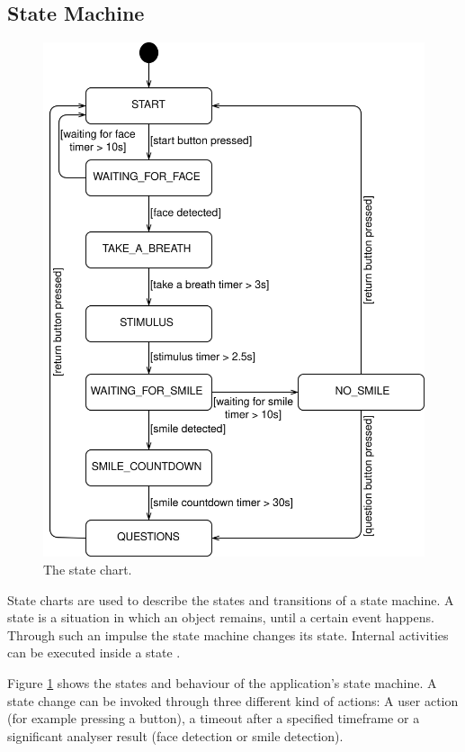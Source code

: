 \subsection{State Machine}

\begin{figure}
  \includegraphics[width=\linewidth]{figures/state_chart.png}
  \caption{The state chart.}
  \label{fig:state_chart}
\end{figure}

State charts are used to describe the states and transitions of a state machine. A state is a situation in which an object remains, until a certain event happens. Through such an impulse the state machine changes its state. Internal activities can be executed inside a state \cite{Modeling_with_UML}.

Figure \ref{fig:state_chart} shows the states and behaviour of the application's state machine.
A state change can be invoked through three different kind of actions: A user action (for example pressing a button), a timeout after a specified timeframe or a significant analyser result (face detection or smile detection).

